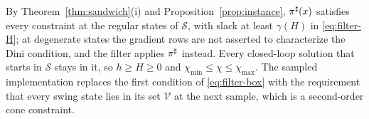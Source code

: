 By Theorem~\ref{thm:sandwich}(i) and Proposition~\ref{prop:instance}, $\pi^{\sharp}(x)$ satisfies every constraint at the regular states of $\mathcal S$, with slack at least $\gamma(H)$ in \eqref{eq:filter-H}; at degenerate states the gradient rows are not asserted to characterize the Dini condition, and the filter applies $\pi^{\sharp}$ instead. Every closed-loop solution that starts in $\mathcal S$ stays in it, so $h\ge H\ge0$ and $\chi_{\min}\le\chi\le\chi_{\max}$. The sampled implementation replaces the first condition of \eqref{eq:filter-box} with the requirement that every swing state lies in its set $\mathcal V$ at the next sample, which is a second-order cone constraint.
